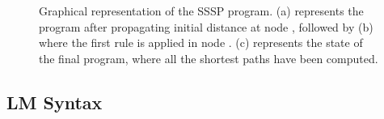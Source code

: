 \begin{figure}[ht]
\begin{center}
  \hspace{0.4cm}
  \hspace{0.4cm}
\end{center}
\caption{Graphical representation of the SSSP program. (a) represents the
   program after propagating initial distance at node , followed by
   (b) where the first rule is applied in node . (c)
   represents the state of the final program, where all the shortest paths
   have been computed.}
\label{fig:shortest_path_program}
\end{figure}


\subsection{LM Syntax}

